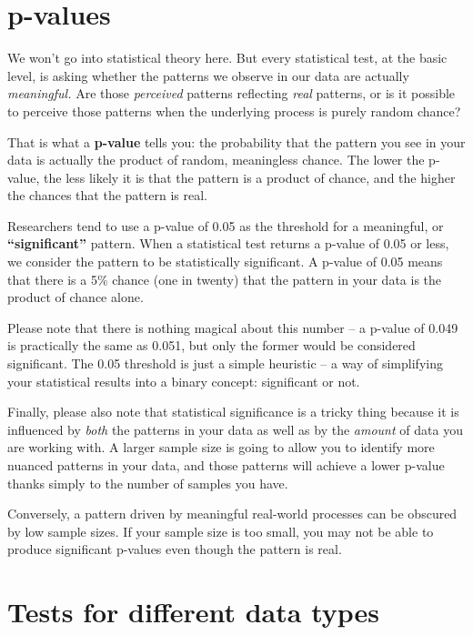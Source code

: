 \documentclass[]{book}
\begin{document}
\hypertarget{p-values}{%
\section*{p-values}\label{p-values}}

We won't go into statistical theory here. But every statistical test, at the basic level, is asking whether the patterns we observe in our data are actually \emph{meaningful.} Are those \emph{perceived} patterns reflecting \emph{real} patterns, or is it possible to perceive those patterns when the underlying process is purely random chance?

That is what a \textbf{p-value} tells you: the probability that the pattern you see in your data is actually the product of random, meaningless chance. The lower the p-value, the less likely it is that the pattern is a product of chance, and the higher the chances that the pattern is real.

Researchers tend to use a p-value of 0.05 as the threshold for a meaningful, or \textbf{``significant''} pattern. When a statistical test returns a p-value of 0.05 or less, we consider the pattern to be statistically significant. A p-value of 0.05 means that there is a 5\% chance (one in twenty) that the pattern in your data is the product of chance alone.

Please note that there is nothing magical about this number -- a p-value of 0.049 is practically the same as 0.051, but only the former would be considered significant. The 0.05 threshold is just a simple heuristic -- a way of simplifying your statistical results into a binary concept: significant or not.

Finally, please also note that statistical significance is a tricky thing because it is influenced by \emph{both} the patterns in your data as well as by the \emph{amount} of data you are working with. A larger sample size is going to allow you to identify more nuanced patterns in your data, and those patterns will achieve a lower p-value thanks simply to the number of samples you have.

Conversely, a pattern driven by meaningful real-world processes can be obscured by low sample sizes. If your sample size is too small, you may not be able to produce significant p-values even though the pattern is real.

\hypertarget{tests-for-different-data-types}{%
\section*{Tests for different data types}\label{tests-for-different-data-types}}
\end{document}
